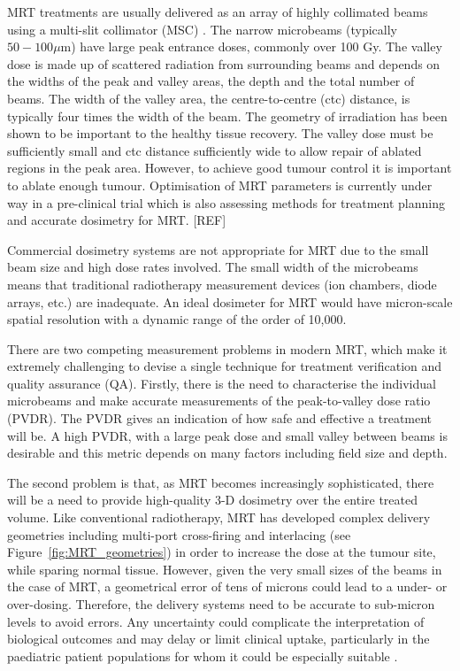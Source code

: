 	
	MRT treatments are usually delivered as an array of highly collimated beams using a multi-slit collimator (MSC) \cite{brauer2005characterization}. The narrow microbeams (typically $50-100 \mu$m) have large peak entrance doses, commonly over 100 Gy.
	The valley dose is made up of scattered radiation from surrounding beams and depends on the widths of the peak and valley areas, the depth and the total number of beams. The width of the valley area, the centre-to-centre (ctc) distance, is typically four times the width of the beam. 
	The geometry of irradiation has been shown to be important to the healthy tissue recovery. The valley dose must be sufficiently small and ctc distance sufficiently wide to allow repair of ablated regions in the peak area. However, to achieve good tumour control it is important to ablate enough tumour. Optimisation of MRT parameters is currently under way in a pre-clinical trial which is also assessing methods for treatment planning and accurate dosimetry for MRT. [REF]
	
	
	
	Commercial dosimetry systems are not appropriate for MRT due to the small beam size and high dose rates involved.	The small width of the microbeams means that traditional radiotherapy measurement devices (ion chambers, diode arrays, etc.) are inadequate. An ideal dosimeter for MRT would have micron-scale spatial resolution with a dynamic range of the order of 10,000.

    There are two competing measurement problems in modern MRT, which make it extremely challenging to devise a single technique for treatment verification and quality assurance (QA). Firstly, there is the need to characterise the individual microbeams and make accurate measurements of the peak-to-valley dose ratio (PVDR). The PVDR gives an indication of how safe and effective a treatment will be. A high PVDR, with a large peak dose and small valley between beams is desirable and this metric	depends on many factors including field size and depth. 

	The second problem is that, as MRT becomes increasingly sophisticated, there will be a need to provide high-quality 3-D dosimetry over the entire treated volume. Like conventional radiotherapy, MRT has developed complex delivery geometries including multi-port cross-firing \cite{brauer-krischnew2005} and interlacing \cite{brauer2013preclinical, serduc2009first,serduchigh-precision2010} (see Figure~\ref{fig:MRT_geometries}) in order to increase the dose at the tumour site, while sparing normal tissue. However, given the very small sizes of the beams in the case of MRT, a geometrical error of tens of microns could lead to a under- or over-dosing. Therefore, the delivery systems need to be accurate to sub-micron levels to avoid errors. %
	Any uncertainty could complicate the interpretation of biological outcomes and may delay or limit clinical uptake, particularly in the paediatric patient populations for whom it could be especially suitable \cite{laissue2001weanling}.
		
